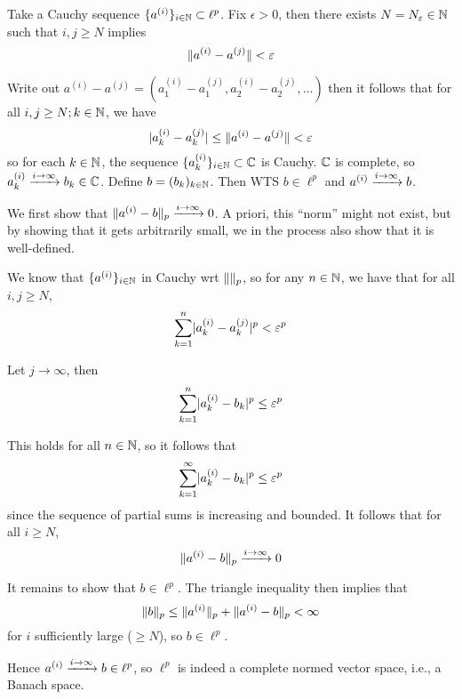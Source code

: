 \documentclass[a4paper, 10pt]{article}
\begin{document}
\begin{solution}
    Take a Cauchy sequence $\{a^{(i)}\}_{i \in \mathbb{N}} \subset \ell^p$. Fix $\epsilon > 0$, then there exists $N = N_\varepsilon \in \mathbb{N}$ such that $i, j \geq N$ implies \begin{equation*}
    \lVert a^{(i)} - a^{(j)}\rVert < \varepsilon
    \end{equation*}

    Write out $a^{(i)} - a^{(j)} = (a^{(i)}_1 - a^{(j)}_1, a^{(i)}_2 - a^{(j)}_2, \ldots)$ then it follows that for all $i, j \geq N; k \in \mathbb{N}$, we have \begin{equation*}
        \lvert a^{(i)}_k - a^{(j)}_k\rvert \leq \lVert a^{(i)} - a^{(j)}\rVert < \varepsilon
    \end{equation*}
    so for each $k \in \mathbb{N}$, the sequence $\{a^{(i)}_k\}_{i \in \mathbb{N}} \subset \mathbb{C}$ is Cauchy. $\mathbb{C}$ is complete, so $a^{(i)}_k \xrightarrow{i \to \infty} b_k \in \mathbb{C}$. Define $b = (b_k)_{k \in \mathbb{N}}$. Then WTS $b \in \ell^p$ and $a^{(i)} \xrightarrow{i \to \infty} b$.

    We first show that $\lVert a^{(i)} - b\rVert_p \xrightarrow{i \to \infty} 0$. A priori, this ``norm'' might not exist, but by showing that it gets arbitrarily small, we in the process also show that it is well-defined.

    We know that $\{a^{(i)}\}_{i \in \mathbb{N}}$ in Cauchy wrt $\lVert\rVert_p$, so for any $n \in \mathbb{N}$, we have that for all $i, j \geq N$,
    \begin{equation*}
    \sum_{k=1}^{n} \lvert a^{(i)}_k - a^{(j)}_k\rvert^p < \varepsilon^p
    \end{equation*}

    Let $j \to \infty$, then \begin{equation*}
    \sum_{k=1}^{n} \lvert a^{(i)}_k - b_k\rvert^p \leq \varepsilon^p
    \end{equation*}

    This holds for all $n \in \mathbb{N}$, so it follows that \begin{equation*}
    \sum_{k=1}^{\infty} \lvert a^{(i)}_k - b_k\rvert^p \leq \varepsilon^p
    \end{equation*}
    since the sequence of partial sums is increasing and bounded. It follows that for all $i \geq N$, \begin{equation*}
    \lVert a^{(i)} - b\rVert_p \xrightarrow{i \to \infty} 0
    \end{equation*}

    It remains to show that $b \in \ell^p$. The triangle inequality then implies that \begin{equation*}
    \lVert b\rVert_p \leq \lVert a^{(i)}\rVert_p +  \lVert a^{(i)} - b\rVert_p < \infty
    \end{equation*}
    for $i$ sufficiently large ($\geq N$), so $b \in \ell^p$.

    Hence $a^{(i)} \xrightarrow{i \to \infty} b \in \ell^p$, so $\ell^p$ is indeed a complete normed vector space, i.e., a Banach space.
\end{solution}
\end{document}
